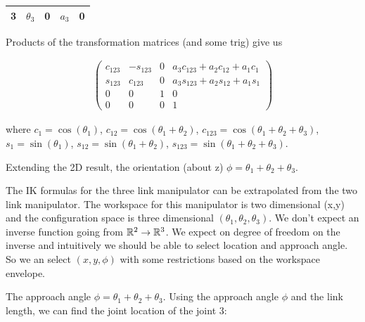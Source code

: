 \begin{longtable}[]{@{}lllll@{}}
\begin{minipage}[t]{0.08\columnwidth}
3\strut
\end{minipage} & \begin{minipage}[t]{0.23\columnwidth}\raggedright
\(\theta_3\)\strut
\end{minipage} & \begin{minipage}[t]{0.14\columnwidth}\raggedright
0\strut
\end{minipage} & \begin{minipage}[t]{0.17\columnwidth}\raggedright
\(a_3\)\strut
\end{minipage} & \begin{minipage}[t]{0.20\columnwidth}\raggedright
0\strut
\end{minipage}\tabularnewline
\bottomrule
\end{longtable}

Products of the transformation matrices (and some trig) give us

\[\begin{aligned}
\begin{pmatrix}c_{123} & -s_{123} & 0 & a_3 c_{123} + a_2 c_{12} + a_1 c_1 \\
   s_{123} & c_{123} & 0 & a_3 s_{123} + a_2 s_{12} + a_1s_1\\
         0 &0 & 1 & 0 \\
         0& 0& 0& 1
\end{pmatrix}
\end{aligned}\]

where \(c_1 = \cos(\theta_1)\), \(c_{12} = \cos(\theta_1+\theta_2)\),
\(c_{123} = \cos(\theta_1+\theta_2+\theta_3)\),
\(s_1 = \sin(\theta_1)\), \(s_{12} = \sin(\theta_1+\theta_2)\),
\(s_{123} = \sin(\theta_1+\theta_2+\theta_3)\).

Extending the 2D result, the orientation (about z)
\(\phi = \theta_1+\theta_2+\theta_3\).

The IK formulas for the three link manipulator can be extrapolated from
the two link manipulator. The workspace for this manipulator is two
dimensional (x,y) and the configuration space is three dimensional
\((\theta_1, \theta_2, \theta_3 )\). We don't expect an inverse function
going from \({\Bbb R}^2 \to {\Bbb R}^3\). We expect on degree of freedom
on the inverse and intuitively we should be able to select location and
approach angle. So we an select \((x, y, \phi)\) with some restrictions
based on the workspace envelope.

The approach angle \(\phi = \theta_1 + \theta_2 + \theta_3\). Using the
approach angle \(\phi\) and the link length, we can find the joint
location of the joint 3:

